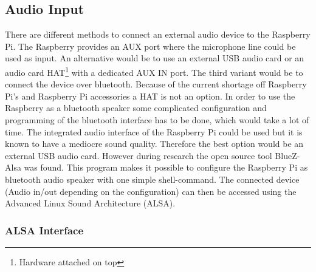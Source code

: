 \subsection{Audio Input}\label{sec:software:rec}
%
There are different methods to connect an external audio device to the Raspberry Pi. The Raspberry provides an AUX port where the microphone line could be used as input. An alternative would be to use an external USB audio card or an audio card HAT\footnote{Hardware attached on top} with a dedicated AUX IN port. The third variant would be to connect the device over bluetooth.\p
%
Because of the current shortage off Raspberry Pi's and Raspberry Pi accessories a HAT is not an option. In order to use the Raspberry as a bluetooth speaker some complicated configuration and programming of the bluetooth interface has to be done, which would take a lot of time. The integrated audio interface of the Raspberry Pi could be used but it is known to have a mediocre sound quality. Therefore the best option would be an external USB audio card. However during research the open source tool BlueZ-Alsa\cite{bokowy_bluez-alsa_2022} was found. This program makes it possible to configure the Raspberry Pi as bluetooth audio speaker with one simple shell-command. The connected device (Audio in/out depending on the configuration) can then be accessed using the Advanced Linux Sound Architecture (ALSA).
%
\subsubsection*{ALSA Interface}

